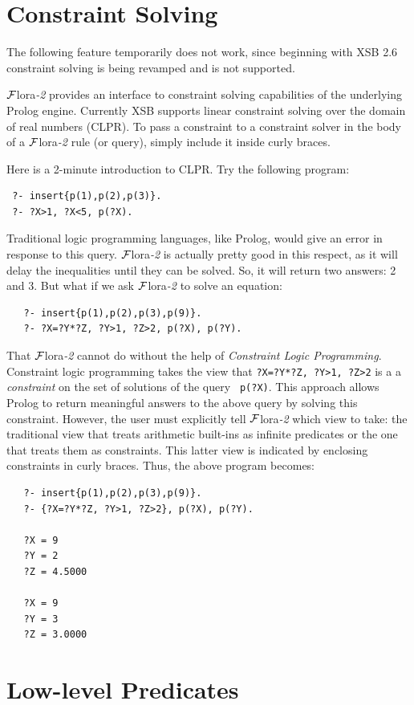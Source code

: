 \documentclass[11pt]{article}
\newcommand{\FLORA}{{\mbox{\sc ${\cal F}${lora}\rm\emph{-2}}}\xspace}
\begin{document}
\section{Constraint Solving}\label{sec-clp}

The following feature temporarily does not work, since beginning with
XSB 2.6 constraint solving is being revamped and is not supported.

\FLORA provides an interface to constraint solving capabilities of the
underlying Prolog engine. Currently XSB supports linear constraint solving
over the domain of real numbers (CLPR).
To pass a constraint to a constraint solver in the body of a \FLORA
rule (or query), simply include it inside curly braces.

Here is a 2-minute introduction to CLPR. Try the following program:
\begin{verbatim}
 ?- insert{p(1),p(2),p(3)}.
 ?- ?X>1, ?X<5, p(?X).
\end{verbatim}
Traditional logic programming languages, like Prolog, would give an error
in response to this query. \FLORA is actually pretty good in this respect,
as it will delay the inequalities until they can be solved. So, it will
return two answers: 2 and 3. But what if we ask \FLORA to solve an equation:
\begin{verbatim}
   ?- insert{p(1),p(2),p(3),p(9)}.
   ?- ?X=?Y*?Z, ?Y>1, ?Z>2, p(?X), p(?Y).
\end{verbatim}
That \FLORA cannot do without the help of 
\emph{Constraint Logic Programming}.
Constraint logic programming takes the view that
\texttt{?X=?Y*?Z, ?Y>1, ?Z>2} is a  
a \emph{constraint} on the set of solutions of the query {\tt
  p(?X)}. This approach allows Prolog to return meaningful answers to the
above query by solving this constraint.
However, the user must explicitly tell \FLORA which view
  to take: the traditional view that treats arithmetic built-ins as
  infinite predicates or the one that treats them as constraints.
  This latter view is indicated by enclosing constraints in curly
  braces. Thus, the above program becomes:
\begin{verbatim}
   ?- insert{p(1),p(2),p(3),p(9)}.
   ?- {?X=?Y*?Z, ?Y>1, ?Z>2}, p(?X), p(?Y).
  
   ?X = 9
   ?Y = 2
   ?Z = 4.5000

   ?X = 9
   ?Y = 3
   ?Z = 3.0000
\end{verbatim}

\section{Low-level Predicates}
\label{sec-lowlevel}
\end{document}
